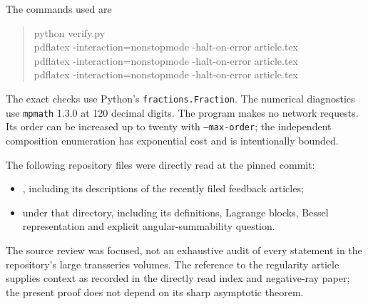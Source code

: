 \documentclass[11pt,a4paper]{article}
\numberwithin{equation}{section}
\theoremstyle{definition}
\theoremstyle{remark}
\begin{document}
The commands used are
\begin{quote}\small\ttfamily
python verify.py\\
pdflatex -interaction=nonstopmode -halt-on-error article.tex\\
pdflatex -interaction=nonstopmode -halt-on-error article.tex\\
pdflatex -interaction=nonstopmode -halt-on-error article.tex
\end{quote}
The exact checks use Python's \texttt{fractions.Fraction}.  The numerical
diagnostics use \texttt{mpmath} 1.3.0 at 120 decimal digits.  The program
makes no network requests.  Its order can be increased up to twenty with
\texttt{--max-order}; the independent composition enumeration has
exponential cost and is intentionally bounded.

The following repository files were directly read at the pinned commit:
\begin{itemize}
\item {},
including its descriptions of the recently filed feedback articles;
\item {}
under that directory, including its definitions, Lagrange blocks,
Bessel representation and explicit angular-summability question.
\end{itemize}
The source review was focused, not an exhaustive audit of every statement
in the repository's large transseries volumes.  The reference to the
regularity article supplies context as recorded in the directly read
index and negative-ray paper; the present proof does not depend on its
sharp asymptotic theorem.
\end{document}
